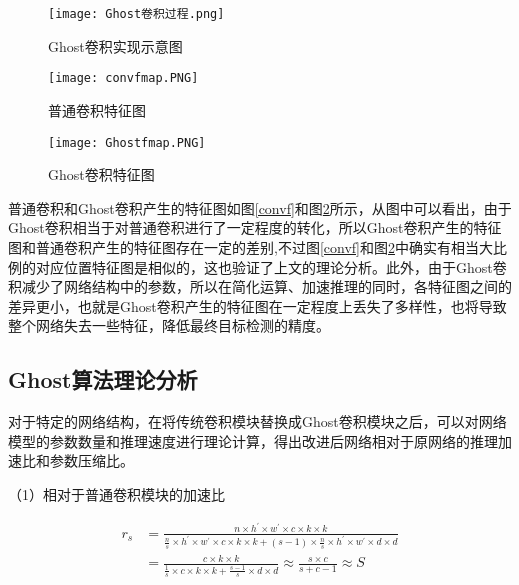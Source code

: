 \begin{figure}[htbp]
    \centering
    \texttt{[image: Ghost卷积过程.png]}
    \caption{Ghost卷积实现示意图}
    \label{Ghostp}
\end{figure}

\begin{figure}[htbp]
	\centering
	\begin{minipage}{0.49\linewidth}
		\centering
		\texttt{[image: convfmap.PNG]}
		\caption{普通卷积特征图}
		\label{convf}%
	\end{minipage}
	\begin{minipage}{0.49\linewidth}
		\centering
		\texttt{[image: Ghostfmap.PNG]}
		\caption{Ghost卷积特征图}
		\label{Ghostf}%
	\end{minipage}
\end{figure}

普通卷积和Ghost卷积产生的特征图如图\ref{convf}和图\ref{Ghostf}所示，从图中可以看出，由于Ghost卷积相当于对普通卷积进行了一定程度的转化，所以Ghost卷积产生的特征图和普通卷积产生的特征图存在一定的差别,不过图\ref{convf}和图\ref{Ghostf}中确实有相当大比例的对应位置特征图是相似的，这也验证了上文的理论分析。此外，由于Ghost卷积减少了网络结构中的参数，所以在简化运算、加速推理的同时，各特征图之间的差异更小，也就是Ghost卷积产生的特征图在一定程度上丢失了多样性，也将导致整个网络失去一些特征，降低最终目标检测的精度。

\subsection{Ghost算法理论分析}
对于特定的网络结构，在将传统卷积模块替换成Ghost卷积模块之后，可以对网络模型的参数数量和推理速度进行理论计算，得出改进后网络相对于原网络的推理加速比和参数压缩比。

（1）相对于普通卷积模块的加速比

\begin{equation}
    \begin{aligned}
    r_{s} &=\frac{n \times h^{\prime} \times w^{\prime} \times c \times k \times k}{\frac{n}{s} \times h^{\prime} \times w^{\prime} \times c \times k \times k+(s-1) \times \frac{n}{s} \times h^{\prime} \times w^{\prime} \times d \times d} \\
    &=\frac{c \times k \times k}{\frac{1}{s} \times c \times k \times k+\frac{s-1}{s} \times d \times d} \approx \frac{s \times c}{s+c-1} \approx S
    \end{aligned}
    \label{jsb}
\end{equation}

